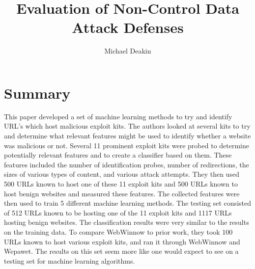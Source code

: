 \documentclass{article}
\title{Evaluation of Non-Control Data Attack Defenses}
\author{Michael Deakin}
\begin{document}
\maketitle
\section{Summary}
This paper developed a set of machine learning methods to try and identify URL's which host malicious exploit kits.
The authors looked at several kits to try and determine what relevant features might be used to identify whether a website was malicious or not.
Several 11 prominent exploit kits were probed to determine potentially relevant features and to create a classifier based on them.
These features included the number of identification probes, number of redirections,
the sizes of various types of content, and various attack attempts.
They then used 500 URLs known to host one of these 11 exploit kits and 500 URLs known to host benign websites and measured these features.
The collected features were then used to train 5 different machine learning methods.
The testing set consisted of 512 URLs known to be hosting one of the 11 exploit kits and 1117 URLs hosting benign websites.
The classification results were very similar to the results on the training data.
To compare WebWinnow to prior work, they took 100 URLs known to host various exploit kits,
and ran it through WebWinnow and Wepawet.
The results on this set seem more like one would expect to see on a testing set for machine learning algorithms.
\end{document}
